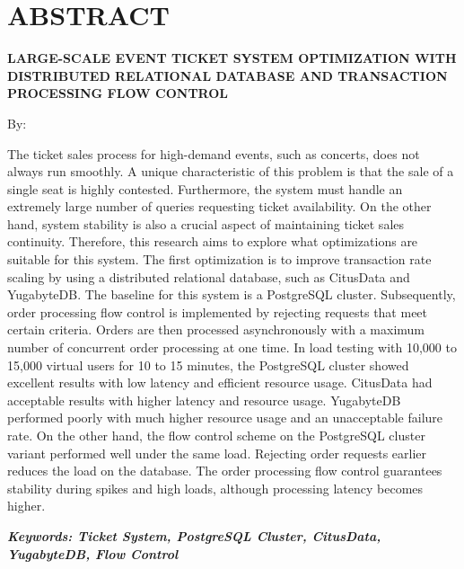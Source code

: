 \clearpage
\chapter*{ABSTRACT}

\begin{center}
  \center
  \begin{singlespace}
    \large\bfseries\MakeUppercase{Large-Scale Event Ticket System Optimization with Distributed Relational Database and Transaction Processing Flow Control}

    \normalfont\normalsize
    By:

    \bfseries \theauthor
  \end{singlespace}
\end{center}


\begin{singlespace}
  \small
  The ticket sales process for high-demand events, such as concerts, does not always run smoothly. A unique characteristic of this problem is that the sale of a single seat is highly contested. Furthermore, the system must handle an extremely large number of queries requesting ticket availability. On the other hand, system stability is also a crucial aspect of maintaining ticket sales continuity. Therefore, this research aims to explore what optimizations are suitable for this system. The first optimization is to improve transaction rate scaling by using a distributed relational database, such as CitusData and YugabyteDB. The baseline for this system is a PostgreSQL cluster. Subsequently, order processing flow control is implemented by rejecting requests that meet certain criteria. Orders are then processed asynchronously with a maximum number of concurrent order processing at one time. In load testing with 10,000 to 15,000 virtual users for 10 to 15 minutes, the PostgreSQL cluster showed excellent results with low latency and efficient resource usage. CitusData had acceptable results with higher latency and resource usage. YugabyteDB performed poorly with much higher resource usage and an unacceptable failure rate. On the other hand, the flow control scheme on the PostgreSQL cluster variant performed well under the same load. Rejecting order requests earlier reduces the load on the database. The order processing flow control guarantees stability during spikes and high loads, although processing latency becomes higher.

  \textbf{\textit{Keywords: Ticket System, PostgreSQL Cluster, CitusData, YugabyteDB, Flow Control}}
\end{singlespace}
\clearpage

\clearpage